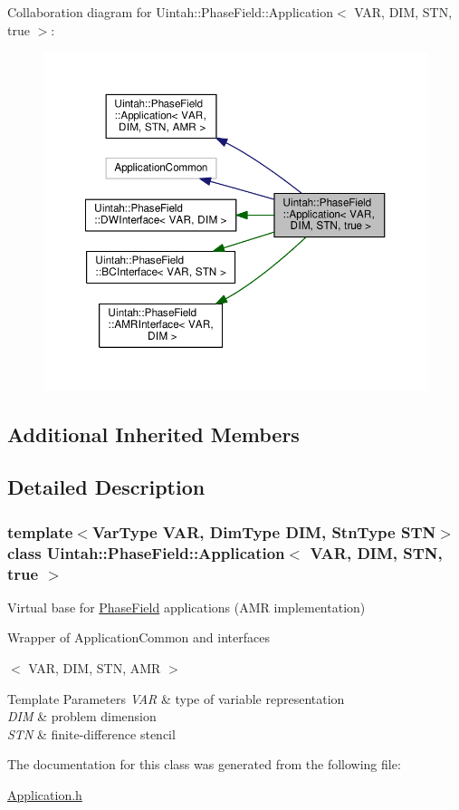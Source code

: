 Collaboration diagram for Uintah\+:\+:Phase\+Field\+:\+:Application$<$ V\+AR, D\+IM, S\+TN, true $>$\+:\nopagebreak
\begin{figure}[H]
\begin{center}
\leavevmode
\includegraphics[width=350pt]{classUintah_1_1PhaseField_1_1Application_3_01VAR_00_01DIM_00_01STN_00_01true_01_4__coll__graph}
\end{center}
\end{figure}
\subsection*{Additional Inherited Members}


\subsection{Detailed Description}
\subsubsection*{template$<$Var\+Type V\+AR, Dim\+Type D\+IM, Stn\+Type S\+TN$>$\newline
class Uintah\+::\+Phase\+Field\+::\+Application$<$ V\+A\+R, D\+I\+M, S\+T\+N, true $>$}

Virtual base for \hyperlink{namespaceUintah_1_1PhaseField}{Phase\+Field} applications (A\+MR implementation) 

Wrapper of Application\+Common and interfaces

$<$ V\+AR, D\+IM, S\+TN, A\+MR $>$ 
\begin{DoxyTemplParams}{Template Parameters}
{\em V\+AR} & type of variable representation \\
\hline
{\em D\+IM} & problem dimension \\
\hline
{\em S\+TN} & finite-\/difference stencil \\
\hline
\end{DoxyTemplParams}


The documentation for this class was generated from the following file\+:\begin{DoxyCompactItemize}
\item 
\hyperlink{Application_8h}{Application.\+h}\end{DoxyCompactItemize}
